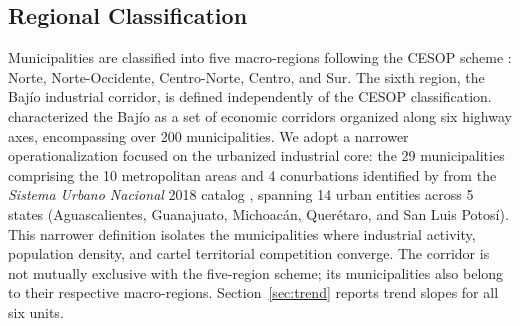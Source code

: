 \subsection{Regional Classification}
Municipalities are classified into five macro-regions following the CESOP scheme \citep{mexicoencifras}: Norte, Norte-Occidente, Centro-Norte, Centro, and Sur.
The sixth region, the Baj\'{i}o industrial corridor, is defined independently of the CESOP classification.
\citet{unger_2014} characterized the Baj\'{i}o as a set of economic corridors organized along six highway axes, encompassing over 200 municipalities.
We adopt a narrower operationalization focused on the urbanized industrial core: the 29 municipalities comprising the 10 metropolitan areas and 4 conurbations identified by \citet{medina_fernandez_2023} from the \emph{Sistema Urbano Nacional} 2018 catalog \citep{conapo_sun_2018}, spanning 14 urban entities across 5 states (Aguascalientes, Guanajuato, Michoac\'{a}n, Quer\'{e}taro, and San Luis Potos\'{i}).
This narrower definition isolates the municipalities where industrial activity, population density, and cartel territorial competition converge. The corridor is not mutually exclusive with the five-region scheme; its municipalities also belong to their respective macro-regions.
Section~\ref{sec:trend} reports trend slopes for all six units.